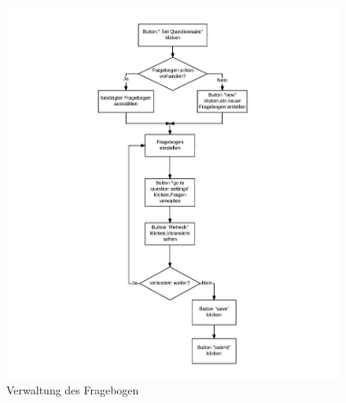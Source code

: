 \documentclass[a4paper]{scrreprt}
\begin{document}
\begin{itemize}
\begin{figure}[H]
                    \includegraphics[scale=0.75]{FragebogenVerwaltung.jpeg}
                    \caption{Verwaltung des Fragebogen}
                \end{figure}



\end{itemize}
\end{document}
